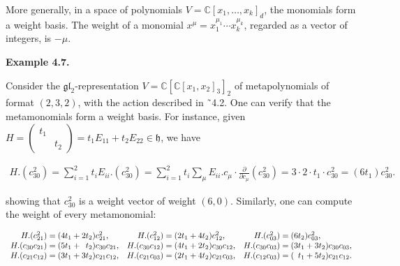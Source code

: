 \documentclass[10pt,a4paper]{article}
\begin{document}
More generally, in a space of polynomials $V=\mathbb{C}[x_{1},\ldots,x_{k}]_{d}$, the monomials form a weight basis. The weight of a monomial $x^{\mu}=x_{1}^{\mu_{1}}\cdots x_{k}^{\mu_{k}}$, regarded as a vector of integers, is $-\mu$.






\par\medskip\noindent\textbf{Example 4.7.}\par



Consider the $\mathfrak{gl}_{2}$-representation $V=\mathbb{C}[\mathbb{C}[x_{1},x_{2}]_{3}]_{2}$ of metapolynomials of format $(2,3,2)$, with the action described in ˜4.2. One can verify that the metamonomials form a weight basis. For instance, given $H=\left(\begin{smallmatrix}t_{1}&\\ &t_{2}\end{smallmatrix}\right)=t_{1}E_{11}+t_{2}E_{22}\in\mathfrak{h}$, we have



\[\begin{aligned}
H.(c_{30}^{2})=\textstyle\sum_{i=1}^{2}t_{i}E_{ii}.(c_{30}^{2})=\textstyle\sum_{i=1}^{2}t_{i}\sum_{\mu}E_{ii}.c_{\mu}\cdot\displaystyle\frac{\partial}{\partial c_{\mu}}(c_{30}^{2})=3\cdot 2\cdot t_{1}\cdot c_{30}^{2}=(6t_{1})c_{30}^{2}.
\end{aligned}\]


showing that $c_{30}^{2}$ is a weight vector of weight $(6,0)$. Similarly, one can compute the weight of every metamonomial:



\[\begin{aligned}
\begin{array}[]{rlrlrl}H.(c_{21}^{2})=\hskip-7.39998pt&(4t_{1}+2t_{2})c_{21}^{2},&H.(c_{12}^{2})=\hskip-7.39998pt&(2t_{1}+4t_{2})c_{12}^{2},&H.(c_{03}^{2})=\hskip-7.39998pt&(6t_{2})c_{03}^{2},\\ H.(c_{30}c_{21})=\hskip-7.39998pt&(5t_{1}+\phantom{1}t_{2})c_{30}c_{21},&H.(c_{30}c_{12})=\hskip-7.39998pt&(4t_{1}+2t_{2})c_{30}c_{12},&H.(c_{30}c_{03})=\hskip-7.39998pt&(3t_{1}+3t_{2})c_{30}c_{03},\\ H.(c_{21}c_{12})=\hskip-7.39998pt&(3t_{1}+3t_{2})c_{21}c_{12},&H.(c_{21}c_{03})=\hskip-7.39998pt&(2t_{1}+4t_{2})c_{21}c_{03},&H.(c_{12}c_{03})=\hskip-7.39998pt&(\phantom{1}t_{1}+5t_{2})c_{21}c_{12}.\end{array}
\end{aligned}\]
\end{document}
